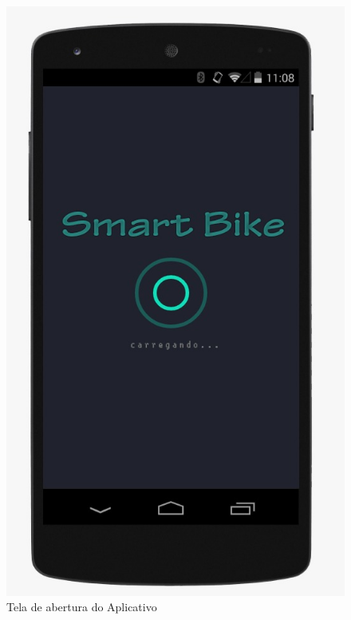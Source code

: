 	\graphicspath{{figuras/}}
	\begin{figure}[!htb]
	\centering
	\includegraphics[scale=0.40]{logo.jpeg}
	\caption{Tela de abertura do Aplicativo}
	\label{img:logo}
	\end{figure}

\newpage	

